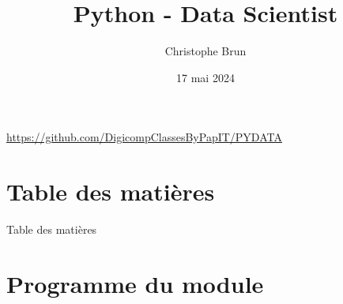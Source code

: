 \documentclass{beamer}
\title[PYDATA]{Python - Data Scientist}
\author{Christophe Brun}
\institute{Digicomp}
\date{17 mai 2024}
\begin{document}
    \begin{frame}
        \titlepage
        \bigbreak
        \centering
        \url{https://github.com/DigicompClassesByPapIT/PYDATA}
    \end{frame}


    \section{Table des matières}\label{sec:toc}

    \begin{frame}{Table des matières}
        \begin{tiny}
            \begin{multicols}{3}
                \tableofcontents
            \end{multicols}
        \end{tiny}
    \end{frame}


    \section{Programme du module}\label{sec:programme-du-module}
\end{document}
